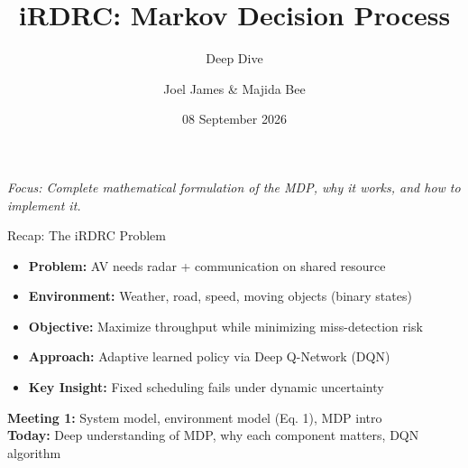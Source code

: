 \documentclass{beamer}
\title{iRDRC: Markov Decision Process}
\subtitle{Deep Dive}
\author{Joel James \& Majida Bee}
\date{08 September 2026}
\institute{IIIT Kottayam --- BTP Discussion 2}
\begin{document}
\begin{frame}[plain]
  \titlepage
  \vspace{-0.5cm}
  \begin{center}
    \small\textit{Focus: Complete mathematical formulation of the MDP, why it works, and how to implement it.}
  \end{center}
\end{frame}


\begin{frame}{Recap: The iRDRC Problem}
  \begin{itemize}
    \item \textbf{Problem:} AV needs radar + communication on shared resource
    \item \textbf{Environment:} Weather, road, speed, moving objects (binary states)
    \item \textbf{Objective:} Maximize throughput while minimizing miss-detection risk
    \item \textbf{Approach:} Adaptive learned policy via Deep Q-Network (DQN)
    \item \textbf{Key Insight:} Fixed scheduling fails under dynamic uncertainty
  \end{itemize}

  \vspace{0.3cm}
  \begin{center}
    \small
    \textbf{Meeting 1:} System model, environment model (Eq. 1), MDP intro\\
    \textbf{Today:} Deep understanding of MDP, why each component matters, DQN algorithm
  \end{center}
\end{frame}
\end{document}
